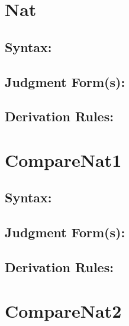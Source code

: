 \documentclass[11pt]{jarticle}
\begin{document}
\section*{Nat}



\subsection*{Syntax:}

\NatDisplayBNF

\subsection*{Judgment Form(s):}


\subsection*{Derivation Rules:}
\NatDisplayRules

\newpage

\section*{CompareNat1}



\subsection*{Syntax:}

\CompareNatiDisplayBNF

\subsection*{Judgment Form(s):}


\subsection*{Derivation Rules:}
\CompareNatiDisplayRules

\newpage

\section*{CompareNat2}
\end{document}
